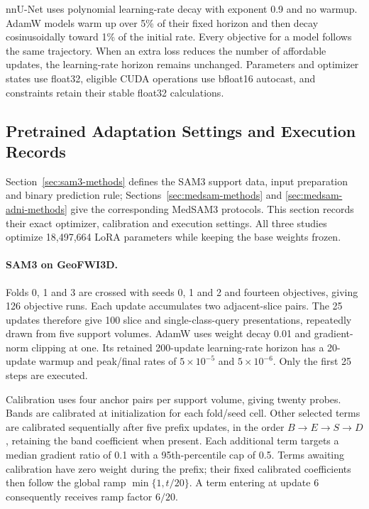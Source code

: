 \documentclass[12pt,a4paper]{article}
\begin{document}
nnU-Net uses polynomial learning-rate decay with exponent 0.9 and no
warmup. AdamW models warm up over 5\% of their fixed horizon and then
decay cosinusoidally toward 1\% of the initial rate. Every objective
for a model follows the same trajectory. When an extra loss reduces
the number of affordable updates, the learning-rate horizon remains
unchanged. Parameters and optimizer states use float32, eligible CUDA
operations use bfloat16 autocast, and constraints retain their stable
float32 calculations.

\subsection{Pretrained Adaptation Settings and Execution Records}
\label{sec:adaptation-implementation}

Section~\ref{sec:sam3-methods} defines the SAM3 support data, input
preparation and binary prediction rule; Sections~\ref{sec:medsam-methods}
and \ref{sec:medsam-adni-methods} give the corresponding MedSAM3
protocols. This section records their exact optimizer, calibration and
execution settings. All three studies optimize 18,497,664 LoRA
parameters while keeping the base weights frozen.

\paragraph{SAM3 on GeoFWI3D.}\label{sec:sam3-methods-details}
Folds 0, 1 and 3 are crossed with seeds 0, 1 and 2 and fourteen
objectives, giving 126 objective runs. Each update accumulates two
adjacent-slice pairs. The 25 updates therefore give 100 slice and
single-class-query presentations, repeatedly drawn from five support
volumes. AdamW uses weight decay 0.01 and gradient-norm clipping at
one. Its retained 200-update learning-rate horizon has a 20-update
warmup and peak/final rates of $5\times10^{-5}$ and $5\times10^{-6}$.
Only the first 25 steps are executed.

Calibration uses four anchor pairs per support volume, giving twenty
probes. Bands are calibrated at initialization for each fold/seed cell.
Other selected terms are calibrated sequentially after five prefix
updates, in the order $B\to E\to S\to D$, retaining the band
coefficient when present. Each additional term targets a median
gradient ratio of 0.1 with a 95th-percentile cap of 0.5. Terms awaiting
calibration have zero weight during the prefix; their fixed calibrated
coefficients then follow the global ramp $\min\{1,t/20\}$. A term
entering at update 6 consequently receives ramp factor $6/20$.
\end{document}
